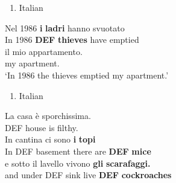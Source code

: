 \begin{enumerate} %
\item 
\label{bkm:Ref69030716}Italian

\end{enumerate} %
\ea\label{}
\gll Nel  1986  \textbf{i} \textbf{ladri} hanno  svuotato\\


In  1986  \textbf{DEF} \textbf{thieves} have  emptied\\ %


\ea\label{}
\gll il mio  appartamento.\\


my  apartment.\\ %


‘In 1986 the thieves emptied my apartment.’
\z


\begin{enumerate} %
\item 
Italian

\end{enumerate} %
\ea\label{}
\gll La  casa  è  sporchissima.\\


DEF  house  is  filthy.\\ %


\ea\label{}
\gll In  cantina  ci  sono  \textbf{i} \textbf{topi}\\


In DEF  basement  there  are  \textbf{DEF} \textbf{mice}\\ %


\ea\label{}
\gll e  sotto  il  lavello  vivono  \textbf{gli} \textbf{scarafaggi.}\\


and  under  DEF  sink  live  \textbf{DEF} \textbf{cockroaches}\\ %


